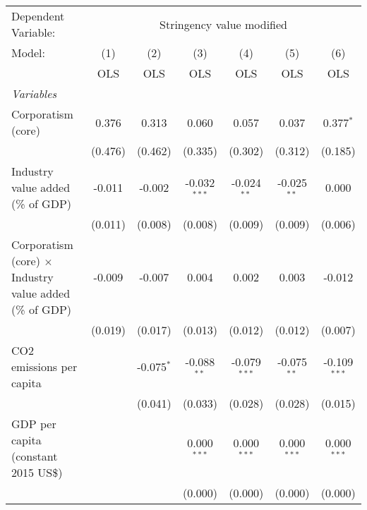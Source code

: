 
\begingroup
\centering
\begin{tabular}{lcccccc}
   \toprule
   Dependent Variable: & \multicolumn{6}{c}{Stringency value modified}\\
   Model:                                                         & (1)     & (2)          & (3)            & (4)            & (5)           & (6)\\  
                                                                  &  OLS    & OLS          & OLS            & OLS            & OLS           & OLS\\  
   \midrule
   \emph{Variables}\\
   Corporatism (core)                                             & 0.376   & 0.313        & 0.060          & 0.057          & 0.037         & 0.377$^{*}$\\   
                                                                  & (0.476) & (0.462)      & (0.335)        & (0.302)        & (0.312)       & (0.185)\\   
   Industry value added (\% of GDP)                               & -0.011  & -0.002       & -0.032$^{***}$ & -0.024$^{**}$  & -0.025$^{**}$ & 0.000\\   
                                                                  & (0.011) & (0.008)      & (0.008)        & (0.009)        & (0.009)       & (0.006)\\   
   Corporatism (core) $\times$ Industry value added (\% of GDP)   & -0.009  & -0.007       & 0.004          & 0.002          & 0.003         & -0.012\\   
                                                                  & (0.019) & (0.017)      & (0.013)        & (0.012)        & (0.012)       & (0.007)\\   
   CO2 emissions per capita                                       &         & -0.075$^{*}$ & -0.088$^{**}$  & -0.079$^{***}$ & -0.075$^{**}$ & -0.109$^{***}$\\   
                                                                  &         & (0.041)      & (0.033)        & (0.028)        & (0.028)       & (0.015)\\   
   GDP per capita (constant 2015 US\$)                            &         &              & 0.000$^{***}$  & 0.000$^{***}$  & 0.000$^{***}$ & 0.000$^{***}$\\   
                                                                  &         &              & (0.000)        & (0.000)        & (0.000)       & (0.000)\\   

\end{tabular}
